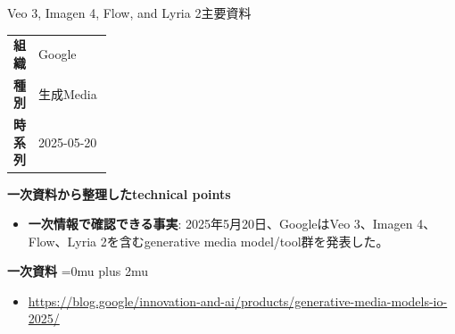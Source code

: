 \begin{technicalnote}{Veo 3, Imagen 4, Flow, and Lyria 2}{主要資料}
\begingroup
\begin{tabularx}{\linewidth}{@{}>{\bfseries}p{0.22\linewidth}X@{}}
組織 & Google \\
種別 & 生成Media \\
時系列 & 2025-05-20 \\
\end{tabularx}
\smallskip
\begin{minipage}{\linewidth}
{\bfseries 一次資料から整理したtechnical points}
\begin{itemize}[leftmargin=1.5em,itemsep=0.35em]
\item \textbf{一次情報で確認できる事実}: 2025年5月20日、GoogleはVeo 3、Imagen 4、Flow、Lyria 2を含むgenerative media model/tool群を発表した。
\end{itemize}
\begin{samepage}
{\bfseries 一次資料}
\begingroup\sloppy
\Urlmuskip=0mu plus 2mu\relax
\begin{itemize}[leftmargin=1.5em,itemsep=0.25em]
\item {\scriptsize\url{https://blog.google/innovation-and-ai/products/generative-media-models-io-2025/}}
\end{itemize}
\endgroup
\end{samepage}
\end{minipage}
\endgroup
\end{technicalnote}
\medskip
